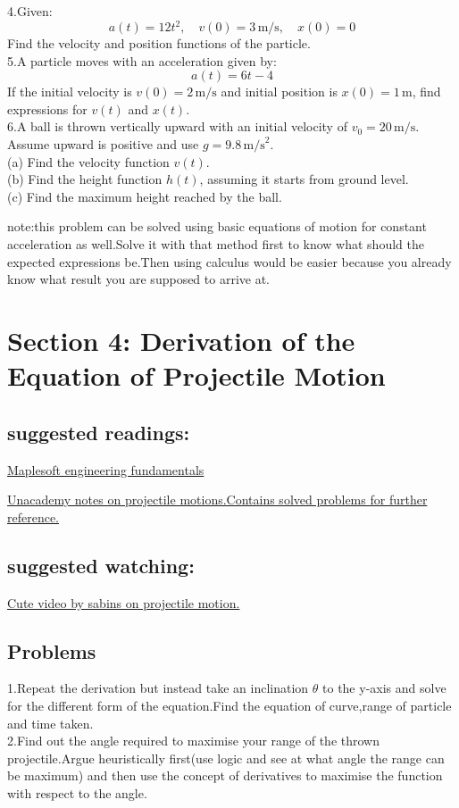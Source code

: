 \documentclass[12pt]{article}
\begin{document}
4.Given:
\[
a(t) = 12t^2, \quad v(0) = 3 \, \text{m/s}, \quad x(0) = 0
\]
Find the velocity and position functions of the particle.\\

5.A particle moves with an acceleration given by:
\[
a(t) = 6t - 4
\]
If the initial velocity is \( v(0) = 2 \, \text{m/s} \) and initial position is \( x(0) = 1 \, \text{m} \), find expressions for \( v(t) \) and \( x(t) \).\\

6.A ball is thrown vertically upward with an initial velocity of \( v_0 = 20 \, \text{m/s} \). Assume upward is positive and use \( g = 9.8 \, \text{m/s}^2 \).\\
(a) Find the velocity function \( v(t) \). \\
(b) Find the height function \( h(t) \), assuming it starts from ground level.\\
(c) Find the maximum height reached by the ball.

note:this problem can be solved using basic equations of motion for constant acceleration as well.Solve it with that method first to know what should the expected expressions be.Then using calculus would be easier because you already know what result you are supposed to arrive at.

\section*{Section 4: Derivation of the Equation of Projectile Motion}
\subsection{suggested readings:}

\href{https://www.maplesoft.com/content/EngineeringFundamentals/1/MapleDocument_1/Projectile%20Motion.pdf}{Maplesoft engineering fundamentals}

\href{https://unacademy.com/content/wp-content/uploads/sites/2/2022/10/Projectile-Motion_Process_Final.pdf}{Unacademy notes on projectile motions.Contains solved problems for further reference.}

\subsection{suggested watching:}
\href{https://www.youtube.com/watch?v=uEnUG_1TYxc&ab_channel=Sabins}{Cute video by sabins on projectile motion.}

\subsection{Problems}
1.Repeat the derivation but instead take an inclination $\theta$ to the y-axis and solve for the different form of the equation.Find the equation of curve,range of particle and time taken.\\

2.Find out the angle required to maximise your range of the thrown projectile.Argue heuristically first(use logic and see at what angle the range can be maximum) and then use the concept of derivatives to maximise the function with respect to the angle.
\end{document}
